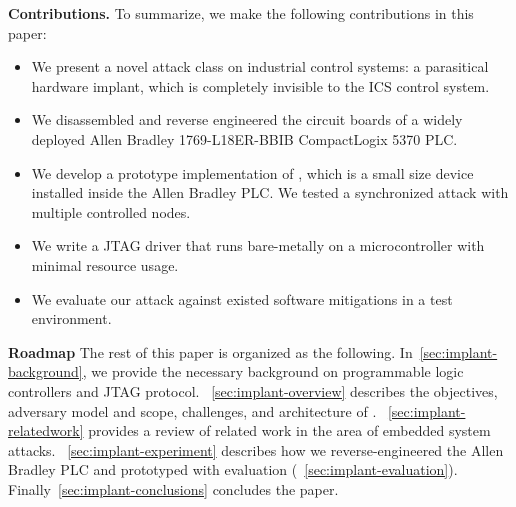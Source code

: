 \textbf{Contributions.} To summarize, we make the following contributions in this paper:
\begin{itemize}[leftmargin=*]
	\item We present a novel attack class on industrial control systems: a parasitical hardware implant, which is completely invisible to the ICS control system.
	\item We disassembled and reverse engineered the circuit boards of a widely deployed Allen Bradley 1769-L18ER-BBIB CompactLogix 5370 PLC. 
	\item We develop a prototype implementation of \name, which is a small size device installed inside the Allen Bradley PLC. We tested a synchronized attack with multiple controlled nodes. 
	\item We write a JTAG driver that runs bare-metally on a microcontroller with minimal resource usage.
	\item We evaluate our attack against existed software mitigations in a test environment.

\end{itemize}


\textbf{Roadmap}
The rest of this paper is organized as the following. In~\autoref{sec:implant-background}, we provide the necessary background on programmable logic controllers and JTAG protocol. ~\autoref{sec:implant-overview} describes the objectives, adversary model and scope, challenges, and architecture of \name. ~\autoref{sec:implant-relatedwork} provides a review of related work in the area of embedded system attacks. ~\autoref{sec:implant-experiment} describes how we reverse-engineered the Allen Bradley PLC and prototyped \name with evaluation (~\autoref{sec:implant-evaluation}).  Finally~\autoref{sec:implant-conclusions} concludes the paper.
